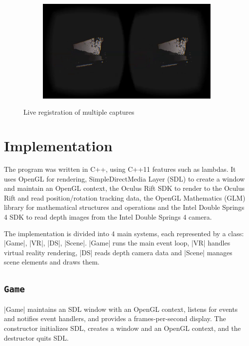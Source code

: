 \documentclass[pageno]{jpaper}
\begin{document}
\begin{figure}
\begin{subfigure}[b]{0.3\textwidth}
    \label{fig:mouse}
  \end{subfigure}
  \qquad
  \begin{subfigure}[b]{0.3\textwidth}
    \includegraphics[width=\textwidth]{shot6.png}
    \label{fig:mouse}
  \end{subfigure}
  \caption{Live registration of multiple captures}\label{fig:animals}
  \label{fig:registration}
\end{figure}

\section{Implementation}

The program was written in C++, using C++11 features such as lambdas. It uses
OpenGL for rendering, SimpleDirectMedia Layer (SDL) to create a window and
maintain an OpenGL context, the Oculus Rift SDK to render to the Oculus Rift and
read position/rotation tracking data, the OpenGL Mathematics (GLM) library for
mathematical structures and operations and the Intel Double Springs 4 SDK to
read depth images from the Intel Double Springs 4 camera.

The implementation is divided into 4 main systems, each represented by a class:
|Game|, |VR|, |DS|, |Scene|. |Game| runs the main event loop, |VR| handles
virtual reality rendering, |DS| reads depth camera data and |Scene| manages
scene elements and draws them.

\subsection{\lstinline|Game|}

|Game| maintains an SDL window with an OpenGL context, listens for events and
notifies event handlers, and provides a frames-per-second display. The
constructor initializes SDL, creates a window and an OpenGL context, and the
destructor quits SDL.
\end{document}
